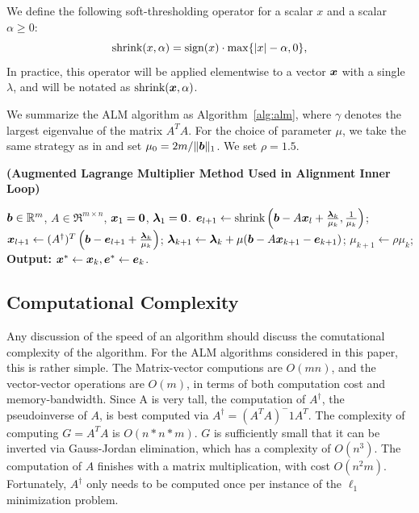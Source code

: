 \documentclass[10pt,twocolumn,letterpaper]{article}
\begin{document}

We define the following soft-thresholding operator for a
scalar $x$ and a scalar $\alpha \geq 0$:
\begin{equation}
\textup{shrink}(x,\alpha) = \textup{sign}(x)\cdot \max \{|x| - \alpha, 0\},
\end{equation}
In practice, this operator will be applied elementwise to a vector ${\boldsymbol{x}}$ with a single $\lambda$,
and will be notated as $\textup{shrink}({\boldsymbol{x}},\alpha)$.

We summarize the ALM algorithm as Algorithm~\ref{alg:alm}, where $\gamma$ denotes the
largest eigenvalue of the matrix $A^TA$. For the choice of parameter $\mu$, we take the same strategy as
in \cite{YangJ2009-pp} and set $\mu_0 = 2m / \|\boldsymbol{b}\|_1$. We set $\rho=1.5$.
\begin{algorithm}[h]
\caption{\bf (Augmented Lagrange Multiplier Method Used in Alignment Inner Loop)}
\begin{algorithmic}[1]
 $\boldsymbol{b} \in \mathbb R^m$, $A \in \Re^{m \times n}$,
${\boldsymbol{x}}_1 = \boldsymbol{0}$, $\boldsymbol{\lambda}_1 = \boldsymbol{0}$.
\STATE $\boldsymbol{e}_{l+1} \leftarrow \textup{shrink}\left(\boldsymbol{b} - A{\boldsymbol{x}}_l + \frac{\boldsymbol{\lambda}_k}{\mu_k}, \frac{1}{\mu_k}\right)$;
\STATE ${\boldsymbol{x}}_{l+1} \leftarrow (A^\dagger)^T \left(\boldsymbol{b} - \boldsymbol{e}_{l+1} + \frac{\boldsymbol{\lambda}_k}{\mu_k} \right) $;
\ENDWHILE
\STATE $\boldsymbol{\lambda}_{k+1} \leftarrow \boldsymbol{\lambda}_k + \mu (\boldsymbol{b} - A{\boldsymbol{x}}_{k+1} - \boldsymbol{e}_{k+1})$;
\STATE $\mu_{k+1} \leftarrow \rho\mu_k$;
\ENDWHILE \STATE
{\bf Output:} ${\boldsymbol{x}}^* \leftarrow {\boldsymbol{x}}_k, \boldsymbol{e}^* \leftarrow \boldsymbol{e}_k$.
\end{algorithmic}
\label{alg:alm}
\end{algorithm}

\subsection{Computational Complexity}
Any discussion of the speed of an algorithm should discuss the comutational complexity of the algorithm.  For the ALM
algorithms considered in this paper, this is rather simple.
The Matrix-vector computions are $O(mn)$, and the vector-vector operations are $O(m)$, 
in terms of both computation cost and memory-bandwidth.  Since A is very tall, 
the computation of $A^\dagger$, the pseudoinverse of $A$, is best computed via $A^\dagger = (A^TA)^-1 A^T$.
The complexity of computing $G = A^T A$ is $O(n*n*m)$.  $G$ is sufficiently small that it can be inverted via
Gauss-Jordan elimination, which has a complexity of $O(n^3)$.  The computation of $A$ finishes with a matrix
multiplication, with cost $O(n^2 m)$.
Fortunately, $A^\dagger$ only needs to be computed once per instance of the $\ell_1$ minimization problem.
\end{document}
